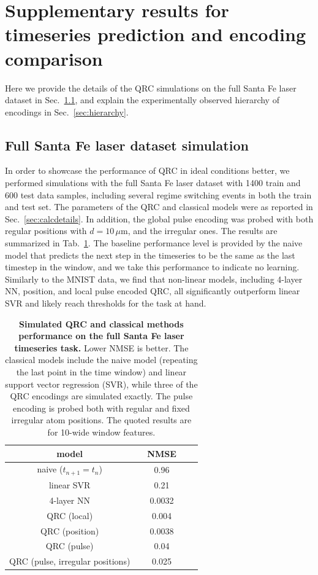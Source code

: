 \documentclass[english,floatfix,twocolumn,showpacs, aps, prx, reprint, superscriptaddress, longbibliography]{revtex4-2}
\begin{document}
\section{Supplementary results for timeseries prediction and encoding comparison}
\label{sec:timeseries}

Here we provide the details of the QRC simulations on the full Santa Fe laser dataset in Sec.~\ref{sec:fullSFlas}, and explain the experimentally observed hierarchy of encodings in Sec.~\ref{sec:hierarchy}.

\subsection{Full Santa Fe laser dataset simulation}
\label{sec:fullSFlas}

In order to showcase the performance of QRC in ideal conditions better, we performed simulations with the full Santa Fe laser dataset \cite{Weigend1993-bg} with 1400 train and 600 test data samples, including several regime switching events in both the train and test set. The parameters of the QRC and classical models were as reported in Sec.~\ref{sec:calcdetails}. In addition, the global pulse encoding was probed with both regular positions with $d=10 \, \mu \mathrm{m}$, and the irregular ones. The results are summarized in Tab.~\ref{tab:SFlas_perf}. The baseline performance level is provided by the naive model that predicts the next step in the timeseries to be the same as the last timestep in the window, and we take this performance to indicate no learning. Similarly to the MNIST data, we find that non-linear models, including 4-layer NN, position, and local pulse encoded QRC, all significantly outperform linear SVR and likely reach thresholds for the task at hand.

\begin{table}[htbp]
\centering
\begin{tabular}{@{}ccccc@{}}
\toprule
model &&   NMSE \\\midrule
naive ($t_{n+1}=t_n$)   && 0.96  \\
linear SVR   &&  0.21  \\
4-layer NN   && 0.0032  \\
 QRC (local)   && 0.004  \\
  QRC (position)   && 0.0038  \\
 QRC (pulse)  && 0.04  \\
  QRC (pulse, irregular positions)   && 0.025  \\ \bottomrule
\end{tabular}
\caption{\textbf{Simulated QRC and classical methods performance on the full Santa Fe laser timeseries task.} Lower NMSE is better. The classical models include the naive model (repeating the last point in the time window) and linear support vector regression (SVR), while three of the QRC encodings are simulated exactly. The pulse encoding is probed both with regular and fixed irregular atom positions. The quoted results are for 10-wide window features.
\label{tab:SFlas_perf}}
\end{table}
\end{document}
